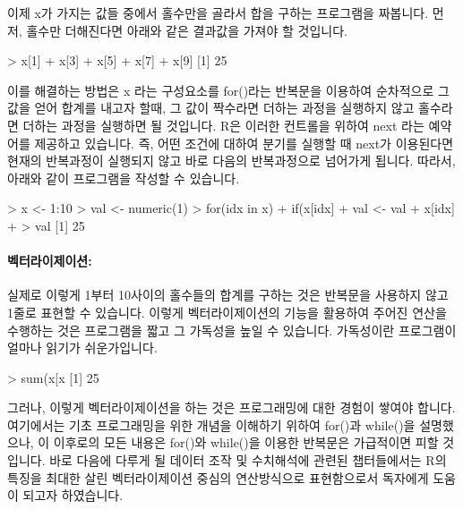 이제 x가 가지는 값들 중에서 홀수만을 골라서 합을 구하는 프로그램을 짜봅니다. 
먼저, 홀수만 더해진다면 아래와 같은 결과값을 가져야 할 것입니다. 

\begin{Schunk}
\begin{Soutput}
> x[1] + x[3] + x[5] + x[7] + x[9]
[1] 25
\end{Soutput}
\end{Schunk}

이를 해결하는 방법은 x 라는 구성요소를 for()라는 반복문을 이용하여 순차적으로 그 값을 얻어 합계를 내고자 할때, 그 값이 짝수라면 더하는 과정을 실행하지 않고 홀수라면 더하는 과정을 실행하면 될 것입니다.
R은 이러한 컨트롤을 위하여 next 라는 예약어를 제공하고 있습니다.
즉, 어떤 조건에 대하여 분기를 실행할 때 next가 이용된다면 현재의 반복과정이 실행되지 않고 바로 다음의 반복과정으로 넘어가게 됩니다. 
따라서, 아래와 같이 프로그램을 작성할 수 있습니다. 

\begin{Schunk}
\begin{Soutput}
> x <- 1:10
> val <- numeric(1)
> for(idx in x){
+ if(x[idx] %% 2 == 0) next
+ val <- val + x[idx]
+ }
> val
[1] 25
\end{Soutput}
\end{Schunk}

\paragraph{벡터라이제이션: }

실제로 이렇게 1부터 10사이의 홀수들의 합계를 구하는 것은 반복문을 사용하지 않고 1줄로 표현할 수 있습니다.
이렇게 벡터라이제이션의 기능을 활용하여 주어진 연산을 수행하는 것은 프로그램을 짧고 그 가독성을 높일 수 있습니다. 
가독성이란 프로그램이 얼마나 읽기가 쉬운가입니다.

\begin{Schunk}
\begin{Soutput}
> sum(x[x %% 2 != 0])
[1] 25
\end{Soutput}
\end{Schunk}

그러나, 이렇게 벡터라이제이션을 하는 것은 프로그래밍에 대한 경험이 쌓여야 합니다. 
여기에서는 기초 프로그래밍을 위한 개념을 이해하기 위하여 for()과 while()을 설명했으나, 이 이후로의 모든 내용은 for()와 while()을 이용한 반복문은 가급적이면 피할 것입니다.
바로 다음에 다루게 될 데이터 조작 및 수치해석에 관련된 챕터들에서는 R의 특징을 최대한 살린 벡터라이제이션 중심의 연산방식으로 표현함으로서 독자에게 도움이 되고자 하였습니다.

